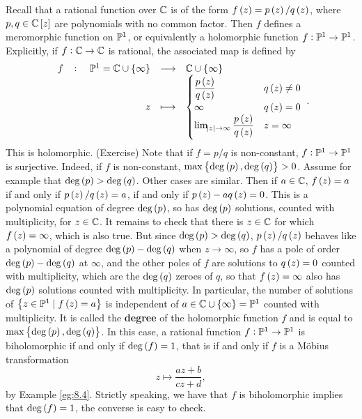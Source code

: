 \pagebreak

\begin{example}
Recall that a rational function over $ \C $ is of the form $ f\br{z} = p\br{z} / q\br{z} $, where $ p, q \in \C\sbr{z} $ are polynomials with no common factor. Then $ f $ defines a meromorphic function on $ \P^1 $, or equivalently a holomorphic function $ f : \P^1 \to \P^1 $. Explicitly, if $ f : \C \to \C $ is rational, the associated map is defined by
$$ \function[f]{\P^1 = \C \cup \cbr{\infty}}{\C \cup \cbr{\infty}}{z}{
\begin{cases}
\dfrac{p\br{z}}{q\br{z}} & q\br{z} \ne 0 \\
\infty & q\br{z} = 0 \\
\lim_{\abs{z} \to \infty} \dfrac{p\br{z}}{q\br{z}} & z = \infty
\end{cases}
}. $$
This is holomorphic. (Exercise) Note that if $ f = p / q $ is non-constant, $ f : \P^1 \to \P^1 $ is surjective. Indeed, if $ f $ is non-constant, $ \max\cbr{\deg\br{p}, \deg\br{q}} > 0 $. Assume for example that $ \deg\br{p} > \deg\br{q} $. Other cases are similar. Then if $ a \in \C $, $ f\br{z} = a $ if and only if $ p\br{z} / q\br{z} = a $, if and only if $ p\br{z} - aq\br{z} = 0 $. This is a polynomial equation of degree $ \deg\br{p} $, so has $ \deg\br{p} $ solutions, counted with multiplicity, for $ z \in \C $. It remains to check that there is $ z \in \C $ for which $ f\br{z} = \infty $, which is also true. But since $ \deg\br{p} > \deg\br{q} $, $ p\br{z} / q\br{z} $ behaves like a polynomial of degree $ \deg\br{p} - \deg\br{q} $ when $ z \to \infty $, so $ f $ has a pole of order $ \deg\br{p} - \deg\br{q} $ at $ \infty $, and the other poles of $ f $ are solutions to $ q\br{z} = 0 $ counted with multiplicity, which are the $ \deg\br{q} $ zeroes of $ q $, so that $ f\br{z} = \infty $ also has $ \deg\br{p} $ solutions counted with multiplicity. In particular, the number of solutions of $ \cbr{z \in \P^1 \mid f\br{z} = a} $ is independent of $ a \in \C \cup \cbr{\infty} = \P^1 $ counted with multiplicity. It is called the \textbf{degree} of the holomorphic function $ f $ and is equal to $ \max\cbr{\deg\br{p}, \deg\br{q}} $. In this case, a rational function $ f : \P^1 \to \P^1 $ is biholomorphic if and only if $ \deg\br{f} = 1 $, that is if and only if $ f $ is a M\"obius transformation
$$ z \mapsto \dfrac{az + b}{cz + d}, $$
by Example \ref{eg:8.4}. Strictly speaking, we have that $ f $ is biholomorphic implies that $ \deg\br{f} = 1 $, the converse is easy to check.
\end{example}

